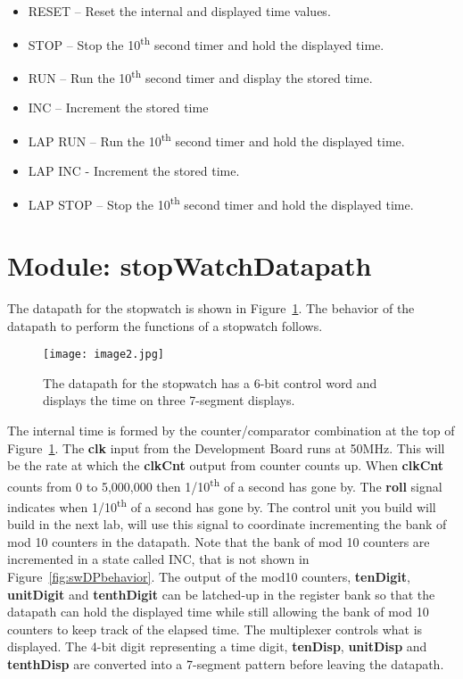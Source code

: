 \begin{itemize}
    \item
        RESET -- Reset the internal and displayed time values.
    \item
        STOP -- Stop the 10\textsuperscript{th} second timer and hold the
        displayed time.
    \item
        RUN -- Run the 10\textsuperscript{th} second timer and display the
        stored time.
    \item
        INC -- Increment the stored time
    \item
        LAP RUN -- Run the 10\textsuperscript{th} second timer and hold the
        displayed time.
    \item
        LAP INC - Increment the stored time.
    \item
        LAP STOP -- Stop the 10\textsuperscript{th} second timer and hold the
        displayed time.
\end{itemize}

\section{Module: stopWatchDatapath}

The datapath for the stopwatch is shown in Figure~\ref{fig:dpSWdatpath}. The behavior of the
datapath to perform the functions of a stopwatch follows.

\begin{figure}[ht]
    \texttt{[image:  image2.jpg]}
    \caption{The datapath for the stopwatch has a 6-bit control word and
    displays the time on three 7-segment displays.}
    \label{fig:dpSWdatpath}
\end{figure}

The internal time is formed by the counter/comparator combination at the
top of Figure~\ref{fig:dpSWdatpath}. The \textbf{clk} input from the Development Board runs
at 50MHz. This will be the rate at which the \textbf{clkCnt} output from
counter counts up. When \textbf{clkCnt} counts from 0 to 5,000,000 then
1/10\textsuperscript{th} of a second has gone by. The \textbf{roll}
signal indicates when 1/10\textsuperscript{th} of a second has gone by.
The control unit you build will build in the next lab, will use this
signal to coordinate incrementing the bank of mod 10 counters in the
datapath. Note that the bank of mod 10 counters are incremented in a
state called INC, that is not shown in Figure~\ref{fig:swDPbehavior}. The output of the mod10
counters, \textbf{tenDigit}, \textbf{unitDigit} and \textbf{tenthDigit}
can be latched-up in the register bank so that the datapath can hold the
displayed time while still allowing the bank of mod 10 counters to keep
track of the elapsed time. The multiplexer controls what is displayed.
The 4-bit digit representing a time digit, \textbf{tenDisp},
\textbf{unitDisp} and \textbf{tenthDisp} are converted into a 7-segment
pattern before leaving the datapath.

